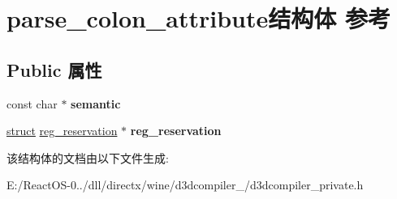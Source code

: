 \hypertarget{structparse__colon__attribute}{}\section{parse\+\_\+colon\+\_\+attribute结构体 参考}
\label{structparse__colon__attribute}
\subsection*{Public 属性}
\begin{DoxyCompactItemize}
\item 
\mbox{\label{structparse__colon__attribute_af69d7611ffec1998441961a8d8fd9cfd}} 
const char $\ast$ {\bfseries semantic}
\item 
\mbox{\label{structparse__colon__attribute_add3542f3278149268a38a182945ce3ff}} 
\hyperlink{interfacestruct}{struct} \hyperlink{structreg__reservation}{reg\+\_\+reservation} $\ast$ {\bfseries reg\+\_\+reservation}
\end{DoxyCompactItemize}


该结构体的文档由以下文件生成\+:\begin{DoxyCompactItemize}
\item 
E\+:/\+React\+O\+S-\/0../dll/directx/wine/d3dcompiler\+\_/d3dcompiler\+\_\+private.\+h\end{DoxyCompactItemize}
